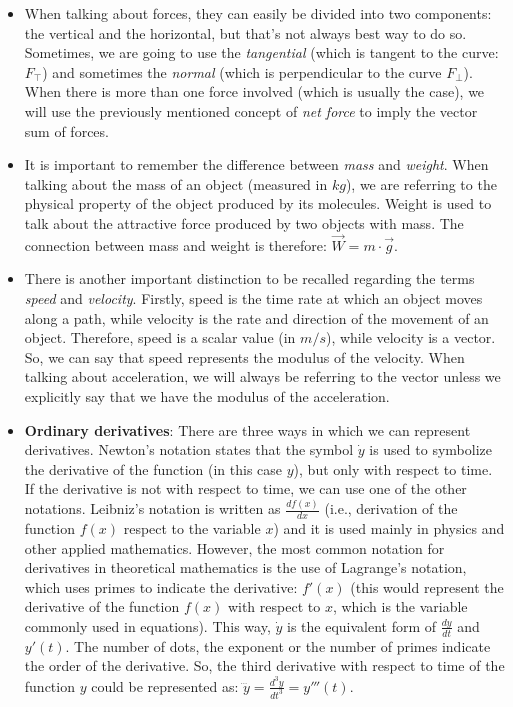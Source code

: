 \documentclass[12pt,twoside,a4paper]{article}
\newcommand{\ds}{\displaystyle}
\newcommand{\tang}{\top}
\begin{document}
\begin{itemize}
		\item When talking about forces, they can easily be divided into two components: the vertical and the horizontal, but that's not always best way to do so. Sometimes, we are going to use the \textit{tangential} (which is tangent to the curve: $F_\tang$) and sometimes the \textit{normal} (which is perpendicular to the curve $F_\perp$). When there is more than one force involved (which is usually the case), we will use the previously mentioned concept of \textit{net force} to imply the vector sum of forces.
		
		\item It is important to remember the difference between \textit{mass} and \textit{weight}. When talking about the mass of an object (measured in $kg$), we are referring to the physical property of the object produced by its molecules. Weight is used to talk about the attractive force produced by two objects with mass. The connection between mass and weight is therefore: $\vec{W} = m \cdot \vec{g}$.
		
		\item There is another important distinction to be recalled regarding the terms \textit{speed} and \textit{velocity}. Firstly, speed is the time rate at which an object moves along a path, while velocity is the rate and direction of the movement of an object. Therefore, speed is a scalar value (in $m/s$), while velocity is a vector. So, we can say that speed represents the modulus of the velocity. When talking about acceleration, we will always be referring to the vector unless we explicitly say that we have the modulus of the acceleration.
		
		\item \textbf{Ordinary derivatives}: There are three ways in which we can represent derivatives. Newton's notation states that the symbol $\dot{y}$ is used to symbolize the derivative of the function (in this case $y$), but only with respect to time. If the derivative is not with respect to time, we can use one of the other notations. Leibniz's notation is written as $\ds \frac{df(x)}{dx}$ (i.e., derivation of the function $f(x)$ respect to the variable $x$) and it is used mainly in physics and other applied mathematics. However, the most common notation for derivatives in theoretical mathematics is the use of Lagrange's notation, which uses primes to indicate the derivative: $f'(x)$ (this would represent the derivative of the function $f(x)$ with respect to $x$, which is the variable commonly used in equations). This way, $\dot{y}$ is the equivalent form of $\ds \frac{dy}{dt}$ and $y'(t)$. The number of dots, the exponent or the number of primes indicate the order of the derivative. So, the third derivative with respect to time of the function $y$ could be represented as: $\ds\dddot{y} = \frac{d^3y}{dt^3} = y'''(t)$.
		

\end{itemize}
\end{document}
